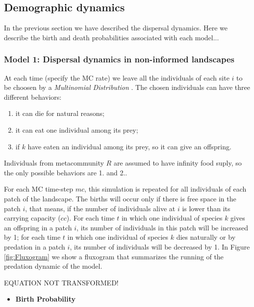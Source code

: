 \subsection{Demographic dynamics}

In the previous section we have described the dispersal dynamics. Here
we describe the birth and death probabilities associated with each model...

\subsubsection{Model 1: Dispersal dynamics in non-informed landscapes}

At each time (specify the MC rate) we leave all the individuals of
each site $i$ to be choosen by a \emph{Multinomial Distribution}
\cite{levin1981representation}. The chosen individuals can have
three different behaviors:
\begin{enumerate}
\item it can die for natural reasons;
\item it can eat one individual among its prey; 
\item if $k$ have eaten an individual among its prey, so it can give an offspring. 
\end{enumerate}

Individuals from metacommunity $R$ are assumed to have infinity food suply, so
the only possible behaviors are 1. and 2.. 

For each MC time-step $mc$, this simulation is repeated for all individuals of
each patch of the landscape. The births will occur only if there is free space
in the patch $i$, that means, if the number of individuals alive at $i$ is
lower than its carrying capacity ($cc$). For each time $t$ in which one
individual of species $k$ gives an offspring in a patch $i$, its number of
individuals in this patch will be increased by 1; for each time $t$ in which
one individual of species $k$ dies naturally or by predation in a patch $i$,
its number of individuals will be decreased by 1. In Figure \ref{fig:Fluxogram}
we show a fluxogram that summarizes the running of the predation dynamic of the
model.

EQUATION NOT TRANSFORMED!

\vspace{1cm}
\begin{itemize}
\item \textbf{Birth Probability}
\end{itemize}

